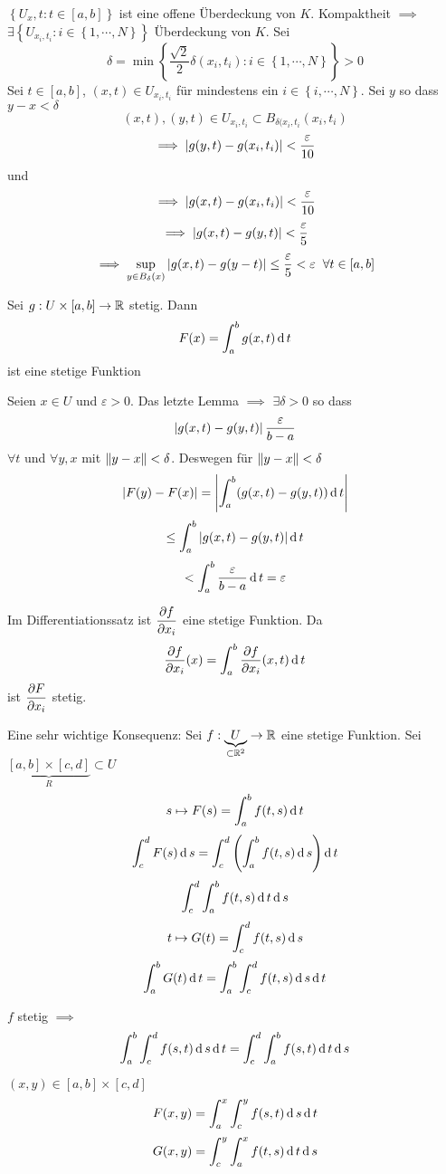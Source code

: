 \begin{Bew}
  $\left\{ U_x,t:t\in [a,b] \right\}$ ist eine offene Überdeckung von $K$. Kompaktheit $\implies$ $\exists \left\{ U_{x_i,t_i}:i\in \left\{ 1,\cdots,N \right\} \right\}$ Überdeckung von $K$. Sei 
  \[\delta=\min\left\{ \frac{\sqrt{2}}{2}\delta(x_i,t_i):i\in\left\{ 1,\cdots,N \right\} \right\}>0\]
  Sei $t\in [a,b]$, $(x,t)\in U_{x_i,t_i}$ für mindestens ein $i\in \left\{ i,\cdots,N \right\}$. Sei $y$ so dass $y-x<\delta$
  \[(x,t),(y,t)\in U_{x_i,t_i}\subset B_{\delta(x_i,t_i}(x_i,t_i)\]
  \[\implies \left| g(y,t)-g(x_i,t_i) \right|<\frac{\varepsilon}{10}\]
  und
  \[\implies \left| g(x,t)-g(x_i,t_i) \right|<\frac{\varepsilon}{10}\]
  \[\implies \left| g(x,t)-g(y,t) \right|<\frac{\varepsilon}{5}\]
  \[\implies \sup_{y\in B_\delta(x)}\left| g(x,t)-g(y-t) \right|\leq\frac{\varepsilon}{5}<\varepsilon\hspace{2mm}\forall t\in [a,b]\]
\end{Bew}
\begin{Kor}
  Sei $g:U\times [a,b]\rightarrow\mathbb{R}$ stetig. Dann
  \[F(x)=\int_a^bg(x,t)\operatorname{d} t\]
  ist eine stetige Funktion
\end{Kor}
\begin{Bew}
  Seien $x\in U$ und $\varepsilon >0$. Das letzte Lemma $\implies$ $\exists \delta >0$ so dass
  \[\left| g(x,t)-g(y,t) \right|\frac{\varepsilon}{b-a}\]
  $\forall t$ und $\forall y,x$ mit $\left\| y-x \right\|<\delta$. Deswegen für $\left\| y-x \right\|<\delta$
  \[\left| F(y)-F(x) \right|=\left| \int_a^b(g(x,t)-g(y,t))\operatorname{d} t \right|\]
  \[\leq\int_a^b\left| g(x,t)-g(y,t) \right|\operatorname{d} t\]
  \[<\int_a^b\frac{\varepsilon}{b-a}\operatorname{d} t=\varepsilon\]
\end{Bew}
\begin{Bem}
  Im Differentiationssatz ist $\dfrac{\partial f}{\partial x_i}$ eine stetige Funktion. Da
  \[\dfrac{\partial f}{\partial x_i}(x)=\int_a^b\dfrac{\partial f}{\partial x_i}(x,t)\operatorname{d} t\]
  ist $\dfrac{\partial F}{\partial x_i}$ stetig.
\end{Bem}
\begin{Bem}
  Eine sehr wichtige Konsequenz: Sei $f:\underbrace{U}_{\subset\mathbb{R}^2}\rightarrow \mathbb{R}$ eine stetige Funktion. Sei $\underbrace{[a,b]\times [c,d]}_R\subset U$
  \[s\mapsto F(s)=\int_a^b f(t,s)\operatorname{d} t\]
  \[\int_c^dF(s)\operatorname{d} s=\int_c^d\left( \int_a^bf(t,s)\operatorname{d} s \right)\operatorname{d} t\]
  \[\int_c^d\int_a^bf(t,s)\operatorname{d} t\operatorname{d} s\]
  \[t\mapsto G(t)=\int_c^df(t,s)\operatorname{d} s\]
  \[\int_a^bG(t)\operatorname{d} t=\int_a^b\int _c^df(t,s)\operatorname{d} s\operatorname{d} t\]
\end{Bem}
\begin{Sat}
  $f$ stetig $\implies$
  \[\int_a^b\int_c^df(s,t)\operatorname{d} s\operatorname{d} t=\int_c^d\int_a^b f(s,t)\operatorname{d} t\operatorname{d} s\]
\end{Sat}
\begin{Bew}
  $(x,y)\in [a,b]\times [c,d]$
  \[F(x,y)=\int_a^x\int_c^yf(s,t)\operatorname{d} s\operatorname{d} t\]
  \[G(x,y)=\int_c^y\int_a^x f(t,s)\operatorname{d} t\operatorname{d} s\]
\end{Bew}
